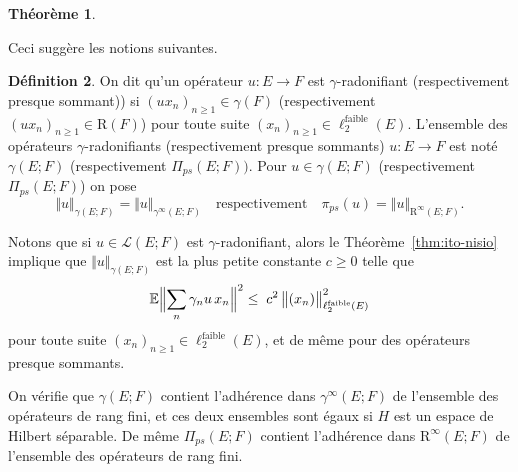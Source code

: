 \documentclass{smfart}
\theoremstyle{plain}
\newtheorem{theorem}{Théorème}[section]
\theoremstyle{definition}
\newtheorem{definition}[theorem]{Définition}
\newcommand{\EE}{\mathbb E}
\newcommand {\FAIBLE} {\text{faible}}
\newcommand{\demi}{{\nicefrac{1}{2}}}
\newcommand{\err}{\mathrm{R}}
\newcommand {\bignorm}[1]{\bigl\| #1 \bigr\|}
\newcommand {\Bignorm}[1]{\Bigl\| #1 \Bigr\|}
\newcommand {\BOUNDED} {{\mathcal L}}
\newcounter{aufzi}
\newcounter{aufzii}
\begin{document}
\begin{theorem}
\end{theorem}



\noindent Ceci suggère les notions suivantes.



\begin{definition} On dit qu'un opérateur $u: E\to F$ est
  $\gamma$-radonifiant (respectivement presque sommant)) si $(ux_n)_{n\ge 1}\in
  \gamma(F)$ (respectivement  $(ux_n)_{n\ge 1}\in \err(F)$) pour toute suite
  $(x_n)_{n\ge 1} \in \ell_2^\FAIBLE(E)$. L'ensemble des opérateurs
  $\gamma$-radonifiants (respectivement presque sommants) $u:E\to F$ est noté
  $\gamma(E; F)$ (respectivement $\Pi_{ps}(E; F))$.  Pour $u \in \gamma(E; F)$
  (respectivement $\Pi_{ps}(E; F)$) on pose
\[
    \Vert u \Vert_{\gamma(E; F)} =\Vert u \Vert_{\gamma^{\infty}(E; F)} \quad \mbox{respectivement} \quad  \pi_{ps} (u) =\Vert u \Vert_{\err^\infty(E; F)}.
\]  
\end{definition}

\noindent Notons que si $u \in \BOUNDED(E; F)$ est $\gamma$-radonifiant, alors
le Théorème~\ref{thm:ito-nisio} implique que $\Vert u
\Vert_{\gamma(E; F)}$ est la plus petite constante $c \ge 0$ telle que
\[
\EE \Bignorm{ \sum_n \gamma_n u \, x_n }^2 \le \; c^2 \, \bignorm{   (x_n) }^2_{\ell_2^\FAIBLE(E)}
\]
pour toute suite $(x_n)_{n\ge 1} \in {\ell_2^\FAIBLE(E)}$, et de même
pour des opérateurs presque sommants.


\noindent On vérifie que $\gamma(E; F)$ contient l'adhérence dans
$\gamma^{\infty}(E; F)$ de l'ensemble des opérateurs de rang fini, et
ces deux ensembles sont égaux si $H$ est un espace de Hilbert
séparable. De même $\Pi_{ps}(E; F)$ contient l'adhérence dans
$\err^\infty(E; F)$ de l'ensemble des opérateurs de rang fini.
\end{document}
